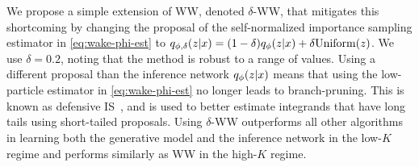We propose a simple extension of \gls{WW}, denoted $\delta$-\acrshort{WW}, that mitigates this shortcoming by changing the proposal of the self-normalized importance sampling estimator in \cref{eq:wake-phi-est} to \(q_{\phi, \delta}(z \lvert x) = (1 - \delta) q_\phi(z \lvert x) + \delta \mathrm{Uniform}(z)\).
We use $\delta = 0.2$, noting that the method is robust to a range of values.
Using a different proposal than the inference network $q_\phi(z \lvert x)$ means that using the low-particle estimator in \cref{eq:wake-phi-est} no longer leads to branch-pruning.
This is known as defensive \acrlong{IS}~\citep{hesterberg1995weighted}, and is used to better estimate integrands that have long tails using short-tailed proposals.
Using $\delta$-\gls{WW} outperforms all other algorithms in learning both the generative model and the inference network in the low-$K$ regime and performs similarly as \gls{WW} in the high-$K$ regime.


